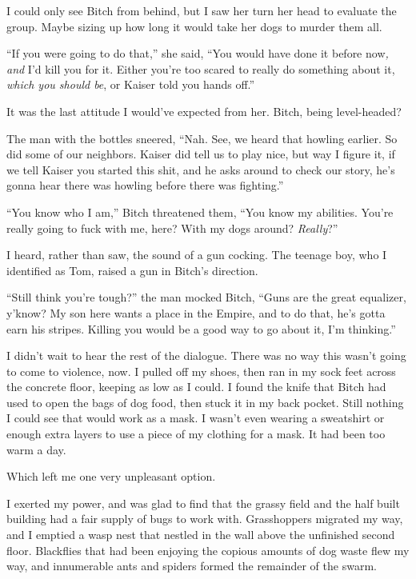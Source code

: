 I could only see Bitch from behind, but I saw her turn her head to evaluate the group.  Maybe sizing up how long it would take her dogs to murder them all.



``If you were going to do that,'' she said, ``You would have done it before now\emph{, and }I'd kill you for it.  Either you're too scared to really do something about it, \emph{which you should be}, or Kaiser told you hands off.''



It was the last attitude I would've expected from her.  Bitch, being level-headed?



The man with the bottles sneered, ``Nah.  See, we heard that howling earlier.  So did some of our neighbors.  Kaiser did tell us to play nice, but way I figure it, if we tell Kaiser you started this shit, and he asks around to check our story, he's gonna hear there was howling before there was fighting.''



``You know who I am,'' Bitch threatened them, ``You know my abilities.  You're really going to fuck with me, here?  With my dogs around?  \emph{Really}?''



I heard, rather than saw, the sound of a gun cocking.  The teenage boy, who I identified as Tom, raised a gun in Bitch's direction.



``Still think you're tough?'' the man mocked Bitch, ``Guns are the great equalizer, y'know?  My son here wants a place in the Empire, and to do that, he's gotta earn his stripes.  Killing you would be a good way to go about it, I'm thinking.''



I didn't wait to hear the rest of the dialogue.  There was no way this wasn't going to come to violence, now.  I pulled off my shoes, then ran in my sock feet across the concrete floor, keeping as low as I could.  I found the knife that Bitch had used to open the bags of dog food, then stuck it in my back pocket.  Still nothing I could see that would work as a mask.  I wasn't even wearing a sweatshirt or enough extra layers to use a piece of my clothing for a mask.  It had been too warm a day.



Which left me one very unpleasant option.



I exerted my power, and was glad to find that the grassy field and the half built building had a fair supply of bugs to work with.  Grasshoppers migrated my way, and I emptied a wasp nest that nestled in the wall above the unfinished second floor.  Blackflies that had been enjoying the copious amounts of dog waste flew my way, and innumerable ants and spiders formed the remainder of the swarm.



